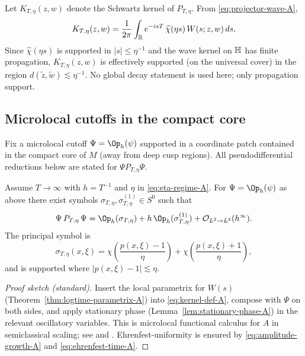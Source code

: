 Let $K_{T,\eta}(z,w)$ denote the Schwartz kernel of $P_{T,\eta}$. From \eqref{eq:projector-wave-A},
\begin{equation}\label{eq:kernel-def-A}
K_{T,\eta}(z,w)=\frac{1}{2\pi}\int_{\mathbb{R}} e^{-isT}\,\widehat\chi(\eta s)\,W(s;z,w)\,ds.
\end{equation}
Since $\widehat\chi(\eta s)$ is supported in $|s|\le \eta^{-1}$ and the wave kernel on $\mathbb{H}$ has finite propagation,
$K_{T,\eta}(z,w)$ is effectively supported (on the universal cover) in the region $d(\tilde z,\tilde w)\lesssim \eta^{-1}$.
No global decay statement is used here; only propagation support.

\subsection{Microlocal cutoffs in the compact core}\label{subsec:ch5-cutoffs}

Fix a microlocal cutoff $\Psi=\Op_h(\psi)$ supported in a coordinate patch contained in the compact core
of $M$ (away from deep cusp regions). All pseudodifferential reductions below are stated for $\Psi P_{T,\eta}\Psi$.

\begin{proposition}\label{prop:psido-reduction-A}
Assume $T\to\infty$ with $h=T^{-1}$ and $\eta$ in \eqref{eq:eta-regime-A}. For $\Psi=\Op_h(\psi)$ as above there exist
symbols $\sigma_{T,\eta},\sigma^{(1)}_{T,\eta}\in S^0$ such that
\begin{equation}\label{eq:psido-expansion-A}
\Psi\,P_{T,\eta}\,\Psi=\Op_h(\sigma_{T,\eta})+h\,\Op_h(\sigma^{(1)}_{T,\eta})+\mathcal O_{L^2\to L^2}(h^\infty).
\end{equation}
The principal symbol is
\begin{equation}\label{eq:principal-symbol-A}
\sigma_{T,\eta}(x,\xi)
=\chi\!\left(\frac{p(x,\xi)-1}{\eta}\right)+\chi\!\left(\frac{p(x,\xi)+1}{\eta}\right),
\end{equation}
and is supported where $|p(x,\xi)-1|\lesssim \eta$.
\end{proposition}

\begin{proof}[Proof sketch (standard)]
Insert the local parametrix for $W(s)$ (Theorem~\ref{thm:logtime-parametrix-A}) into \eqref{eq:kernel-def-A},
compose with $\Psi$ on both sides, and apply stationary phase (Lemma~\ref{lem:stationary-phase-A}) in the relevant
oscillatory variables. This is microlocal functional calculus for $A$ in semiclassical scaling; see
\cite[Ch.~14]{Zworski2012} and \cite[Vol.~IV]{Hormander1985}. Ehrenfest-uniformity is ensured by
\eqref{eq:amplitude-growth-A} and \eqref{eq:ehrenfest-time-A}.
\end{proof}

